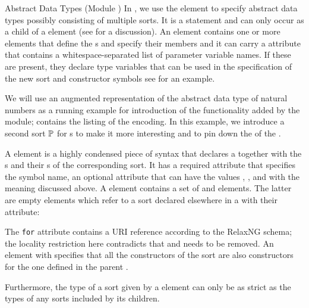 \begin{tchapter}[id=adt,short=Abstract Data Types]{Abstract Data Types (Module {})}
\noindent In {\omdoc}, we use the {} element to specify
abstract data types possibly consisting of multiple sorts.  It is a
{} statement and can only occur as a
child of a {} element (see
{} for a discussion). An
{} element contains one or more {}
elements that define the {s} and specify their
members and it can carry a {} attribute
that contains a whitespace-separated list of parameter variable
names. If these are present, they declare type variables that can be
used in the specification of the new sort and constructor symbols
see {} for an example.

We will use an augmented representation of the abstract data type of natural numbers as a
running example for introduction of the functionality added by the {}
module; {} contains the listing of the {\omdoc} encoding. In this
example, we introduce a second sort ${\mathbb{P}}$ for {s} to
make it more interesting and to pin down the {} of the
{}.

A {} element is a highly condensed piece of syntax that declares a
{} together with the {s} and their
{s} of the corresponding sort. It has a required
{} attribute that specifies the symbol name, an optional
{} attribute that can have the values {},
{}, and {} with the meaning
discussed above. A {} element contains a set of {} and
{} elements.  The latter are empty elements which refer to a sort declared
elsewhere in a {} with their {} attribute: 
\begin{erratum}[reported-by=Hendrik Iben,date=2006-10-06]{The {\tt{for}} attribute
    contains a URI reference according to the RelaxNG schema; the locality restriction
    here contradicts that and needs to be removed.} An {} element with
  {} specifies that all the
  constructors of the sort {} are also constructors for the one
  defined in the parent {}. 
\end{erratum}
Furthermore, the type of a sort given by a {} element can only be as
strict as the types of any sorts included by its {} children.


\end{tchapter}
